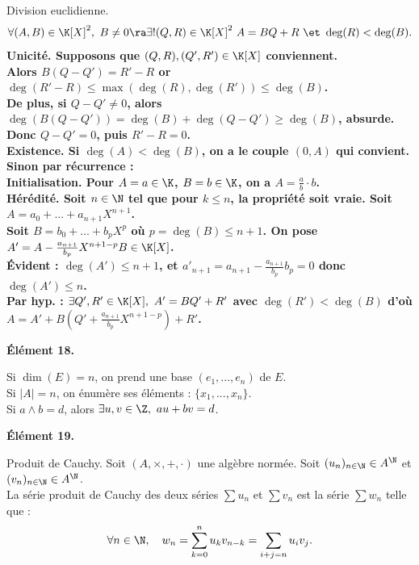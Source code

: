 \documentclass[11pt]{article}
\begin{document}
\begin{prop}{Division euclidienne.}{}
    \begin{equation*}
        \forall (A,B) \in \K[X]^2, ~ B\neq0 \ra \exists!(Q,R) \in \K[X]^2 ~ A = BQ + R ~\et~ \deg(R) < \deg(B).
    \end{equation*}
    \tcblower
    \bf{Unicité.} Supposons que $(Q,R),(Q',R')\in\K[X]$ conviennent.\\
    Alors $B(Q-Q')=R'-R$ or $\deg(R'-R)\leq\max(\deg(R),\deg(R'))\leq\deg(B)$.\\
    De plus, si $Q-Q'\neq0$, alors $\deg(B(Q-Q'))=\deg(B)+\deg(Q-Q')\geq\deg(B)$, absurde.\\
    Donc $Q-Q'=0$, puis $R'-R=0$.\\
    \bf{Existence.} Si $\deg(A)<\deg(B)$, on a le couple $(0,A)$ qui convient. Sinon par récurrence :\\
    \bf{Initialisation.} Pour $A=a\in\K$, $B=b\in\K$, on a $A=\frac{a}{b}\cdot b$.\\
    \bf{Hérédité.} Soit $n\in\N$ tel que pour $k\leq n$, la propriété soit vraie. Soit $A=a_0+...+a_{n+1}X^{n+1}$.\\
    Soit $B=b_0+...+b_pX^p$ où $p=\deg(B)\leq n+1$. On pose $A'=A-\frac{a_{n+1}}{b_p}X^{n+1-p}B\in\K[X]$.\\
    Évident : $\deg(A')\leq n+1$, et $a'_{n+1}=a_{n+1}-\frac{a_{n+1}}{b_p}b_p=0$ donc $\deg(A')\leq n$.\\
    Par hyp. : $\exists Q',R'\in\K[X], ~ A'=BQ'+R'$ avec $\deg(R')<\deg(B)$ d'où $A=A'+B(Q'+\frac{a_{n+1}}{b_p}X^{n+1-p})+R'$.
\end{prop}

\bf{Élément 18.}

\begin{rappel}{}{}
    Si $\dim(E)=n$, on prend une base $(e_1,...,e_n)$ de $E$.\\
    Si $|A|=n$, on énumère ses éléments : $\{x_1,...,x_n\}$.\\
    Si $a\land b = d$, alors $\exists u,v \in \Z, ~ au+bv=d$.
\end{rappel}

\pagebreak

\bf{Élément 19.}

\begin{defi}{Produit de Cauchy.}{}
    Soit $(A,\times,+,\cdot)$ une algèbre normée. Soit $(u_n)_{n\in\N}\in A^\N$ et $(v_n)_{n\in\N}\in A^\N$.\\
    La série produit de Cauchy des deux séries $\sum u_n$ et $\sum v_n$ est la série $\sum w_n$ telle que :
    \begin{equation*}
        \forall n \in \N, \quad w_n = \sum_{k=0}^nu_kv_{n-k}=\sum_{i+j=n}u_iv_j.
    \end{equation*}
\end{defi}
\end{document}
